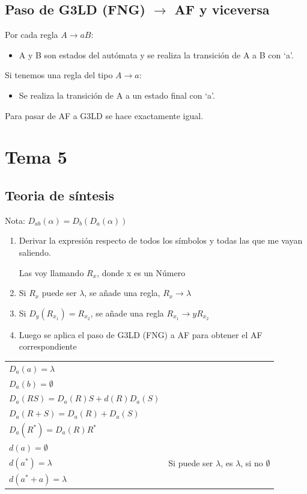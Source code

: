 \documentclass[12pt, twoside, openright]{report} %
\begin{document}
\subsection{Paso de G3LD (FNG) $\boldsymbol{\rightarrow}$ AF y viceversa}
Por cada regla $A \rightarrow aB$:
\begin{itemize}
	\item A y B son estados del autómata y se realiza la transición de A a B con ‘a’.
\end{itemize}
Si tenemos una regla del tipo $A \rightarrow a$:
\begin{itemize}
	\item Se realiza la transición de A a un estado final con ‘a’.
\end{itemize}
Para pasar de AF a G3LD se hace exactamente igual.

\section{Tema 5}
\subsection{Teoria de síntesis}
Nota: $D_{ab}(\alpha)= D_b(D_a(\alpha))$
\begin{enumerate}
	\item Derivar la expresión respecto de todos los símbolos y todas las que me vayan saliendo.

	Las voy llamando $R_x$, donde x es un Número
	\item Si $R_x$ puede ser $\lambda$, se añade una regla, $R_x \rightarrow \lambda$
	\item Si $D_y(R_{x_1}) = R_{x_2}$, se añade una regla $R_{x_1} \rightarrow y R_{x_2}$
	\item Luego se aplica el paso de G3LD (FNG) a AF para obtener el AF correspondiente
\end{enumerate}
\begin{table}[H]
	\centering\begin{tabular}{ll}
$D_a(a) = \lambda$ \\
$D_a(b) = \emptyset$ \\
$D_a(RS) = D_a(R)S + d(R)D_a(S)$ \\
$D_a(R+S) = D_a(R) + D_a(S)$ \\
$D_a(R^*) = D_a(R)R^*$ \\
$d(a) = \emptyset$ \\
$d(a^*) = \lambda$ & Si puede ser $\lambda$, es $\lambda$, si no $\emptyset$ \\
$d(a^*+a) = \lambda$ \\
	\end{tabular}
\end{table}
\end{document}
